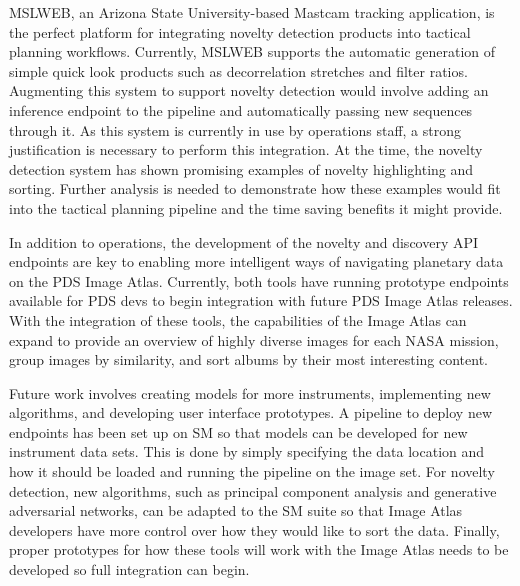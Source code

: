 MSLWEB, an Arizona State University-based Mastcam tracking application, is the perfect platform for integrating novelty detection products into tactical planning workflows. 
Currently, MSLWEB supports the automatic generation of simple quick look products such as decorrelation stretches and filter ratios. 
Augmenting this system to support novelty detection would involve adding an inference endpoint to the pipeline and automatically passing new sequences through it. 
As this system is currently in use by operations staff, a strong justification is necessary to perform this integration. 
At the time, the novelty detection system has shown promising examples of novelty highlighting and sorting. 
Further analysis is needed to demonstrate how these examples would fit into the tactical planning pipeline and the time saving benefits it might provide.

In addition to operations, the development of the novelty and discovery API endpoints are key to enabling more intelligent ways of navigating planetary data on the PDS Image Atlas. 
Currently, both tools have running prototype endpoints available for PDS devs to begin integration with future PDS Image Atlas releases.
With the integration of these tools, the capabilities of the Image Atlas can expand to provide an overview of highly diverse images for each NASA mission, group images by similarity, and sort albums by their most interesting content.

Future work involves creating models for more instruments, implementing new algorithms, and developing user interface prototypes. 
A pipeline to deploy new endpoints has been set up on SM so that models can be developed for new instrument data sets. 
This is done by simply specifying the data location and how it should be loaded and running the pipeline on the image set. 
For novelty detection, new algorithms, such as principal component analysis and generative adversarial networks, can be adapted to the SM suite so that Image Atlas developers have more control over how they would like to sort the data. 
Finally, proper prototypes for how these tools will work with the Image Atlas needs to be developed so full integration can begin.